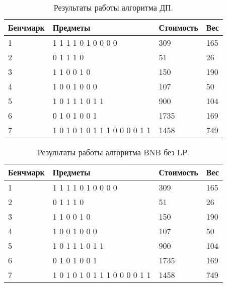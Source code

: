 \documentclass{article}
\begin{document}
\begin{table}[!h]
    \begin{center}
        \begin{tabular}{ | m{4.1em} | m{15em} | m{4.5em} | m{4.5em} |}
            \hline
            Бенчмарк & Предметы                      & Стоимость & Вес \\
            \hline
            1        & 1 1 1 1 0 1 0 0 0 0           & 309       & 165 \\
            \hline
            2        & 0 1 1 1 0                     & 51        & 26  \\
            \hline
            3        & 1 1 0 0 1 0                   & 150       & 190 \\
            \hline
            4        & 1 0 0 1 0 0 0                 & 107       & 50  \\
            \hline
            5        & 1 0 1 1 1 0 1 1               & 900       & 104 \\
            \hline
            6        & 0 1 0 1 0 0 1                 & 1735      & 169 \\
            \hline
            7        & 1 0 1 0 1 0 1 1 1 0 0 0 0 1 1 & 1458      & 749 \\
            \hline
        \end{tabular}
        \caption{Результаты работы алгоритма ДП.}
    \end{center}
\end{table}

\begin{table}[!h]
    \begin{center}
        \begin{tabular}{ | m{4.1em} | m{15em} | m{4.5em} | m{4.5em} |}
            \hline
            Бенчмарк & Предметы                      & Стоимость & Вес \\
            \hline
            1        & 1 1 1 1 0 1 0 0 0 0           & 309       & 165 \\
            \hline
            2        & 0 1 1 1 0                     & 51        & 26  \\
            \hline
            3        & 1 1 0 0 1 0                   & 150       & 190 \\
            \hline
            4        & 1 0 0 1 0 0 0                 & 107       & 50  \\
            \hline
            5        & 1 0 1 1 1 0 1 1               & 900       & 104 \\
            \hline
            6        & 0 1 0 1 0 0 1                 & 1735      & 169 \\
            \hline
            7        & 1 0 1 0 1 0 1 1 1 0 0 0 0 1 1 & 1458      & 749 \\
            \hline
        \end{tabular}
        \caption{Результаты работы алгоритма BNB без LP.}
    \end{center}
\end{table}
\end{document}
